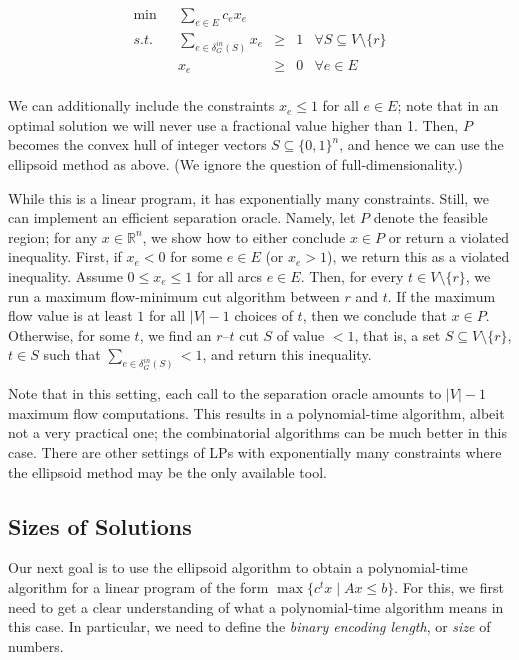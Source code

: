 \documentclass[12pt, showidx, twoside]{article}
\def\R{\mathbb{R}}
\begin{document}
{{{\begin{equation}\label{eq::min-cost-arborescence}
\begin{array}{rrcll}
 \min    &        \sum\limits_{e \in E} c_e x_e  & &\\
s.t.\quad    
 &\sum\limits_{e \in \delta^{in}_G(S)} x_e&\geq& 1 &
      \forall S \subseteq V\setminus\{r\}\\
       & x_e & \geq & 0              & \forall e \in E\\
\end{array}
\end{equation}

We can additionally include the constraints $x_e\le 1$ for all $e\in E$; note that in an optimal solution we will never use a fractional value higher than 1. 
Then, $P$ becomes the convex hull of integer vectors $S\subseteq\{0,1\}^n$, and hence we can use the ellipsoid method as above. (We ignore the question of full-dimensionality.)

While this is a linear program, it has exponentially many constraints. Still, we can implement an efficient separation oracle. Namely, let $P$ denote the feasible region; for any $x\in\R^n$, we show how to  either conclude $x\in P$ or return a violated inequality. First, if $x_e<0$ for some $e\in E$ (or $x_e>1$), we return this as a violated inequality. Assume $0\le x_e\le 1$ for all arcs $e\in E$. Then, for every $t\in V\setminus\{r\}$, we run a maximum flow-minimum cut algorithm between $r$ and $t$. If the maximum flow value is at least $1$ for all $|V|-1$ choices of $t$, then we conclude that $x\in P$. Otherwise, for some $t$, we find an $r$--$t$ cut $S$ of value $<1$, that is, a set $S\subseteq V\setminus\{r\}$, $t\in S$ such that $\sum\limits_{e \in \delta^{in}_G(S)}<1 $, and return this inequality.

Note that in this setting, each call to the separation oracle amounts to $|V|-1$ maximum flow computations. This results in a polynomial-time algorithm, albeit not a very practical one; the combinatorial algorithms can be much better in this case. There are other settings of LPs with exponentially many constraints where the ellipsoid method may be the only available tool. 


\subsection{Sizes of Solutions}\label{sec:sizes}

Our next goal is to use the ellipsoid algorithm to obtain a polynomial-time algorithm for a linear program of the form $\max \{ c^t x \mid Ax \leq b\}$. For this, we first need to get a clear understanding of what a polynomial-time algorithm means in this case. In particular, we need to define the \emph{binary encoding length}, or \emph{size} of numbers.

}}}
\end{document}
